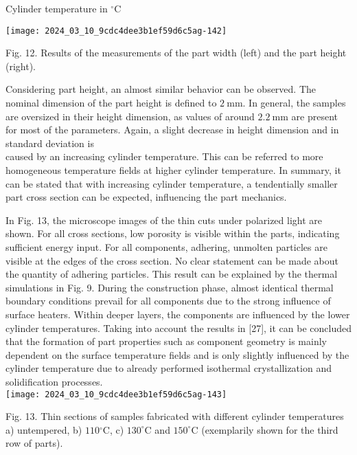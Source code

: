 \documentclass[10pt]{article}
\begin{document}
Cylinder temperature in ${ }^{\circ} \mathrm{C}$

\begin{center}
\texttt{[image: 2024\_03\_10\_9cdc4dee3b1ef59d6c5ag-142]}
\end{center}

Fig. 12. Results of the measurements of the part width (left) and the part height (right).

Considering part height, an almost similar behavior can be observed. The nominal dimension of the part height is defined to $2 \mathrm{~mm}$. In general, the samples are oversized in their height dimension, as values of around $2.2 \mathrm{~mm}$ are present for most of the parameters. Again, a slight decrease in height dimension and in standard deviation is\\
caused by an increasing cylinder temperature. This can be referred to more homogeneous temperature fields at higher cylinder temperature. In summary, it can be stated that with increasing cylinder temperature, a tendentially smaller part cross section can be expected, influencing the part mechanics.

In Fig. 13, the microscope images of the thin cuts under polarized light are shown. For all cross sections, low porosity is visible within the parts, indicating sufficient energy input. For all components, adhering, unmolten particles are visible at the edges of the cross section. No clear statement can be made about the quantity of adhering particles. This result can be explained by the thermal simulations in Fig. 9. During the construction phase, almost identical thermal boundary conditions prevail for all components due to the strong influence of surface heaters. Within deeper layers, the components are influenced by the lower cylinder temperatures. Taking into account the results in [27], it can be concluded that the formation of part properties such as component geometry is mainly dependent on the surface temperature fields and is only slightly influenced by the cylinder temperature due to already performed isothermal crystallization and solidification processes.\\
\texttt{[image: 2024\_03\_10\_9cdc4dee3b1ef59d6c5ag-143]}

Fig. 13. Thin sections of samples fabricated with different cylinder temperatures a) untempered, b) $110{ }^{\circ} \mathrm{C}$, c) $130^{\circ} \mathrm{C}$ and $150^{\circ} \mathrm{C}$ (exemplarily shown for the third row of parts).
\end{document}
